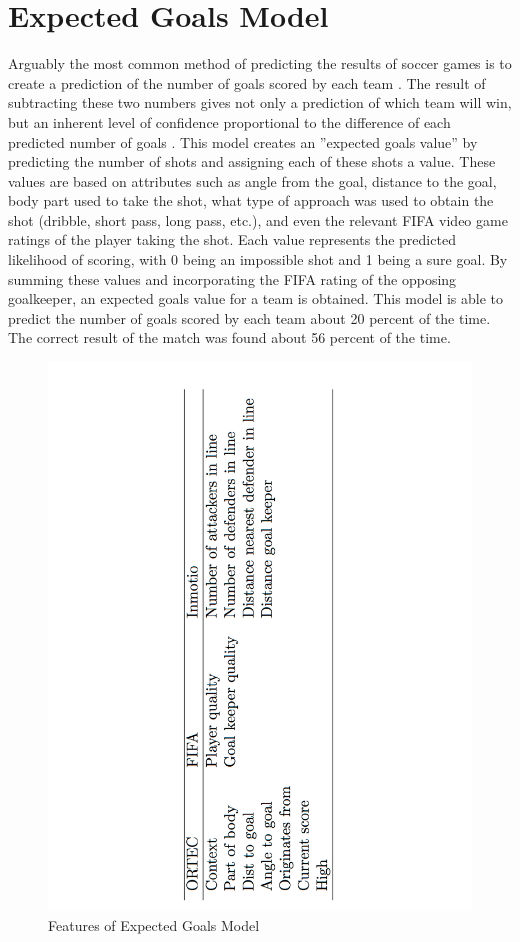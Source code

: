 \documentclass[sigconf]{acmart}
\begin{document}
\section{Expected Goals Model}
Arguably the most common method of predicting the results of soccer games is to create a prediction of the number of goals scored by each team . The result of subtracting these two numbers gives not only a prediction of which team will win, but an inherent level of confidence proportional to the difference of each predicted number of goals \cite{ExpectedGoals}. This model creates an ''expected goals value'' by predicting the number of shots and assigning each of these shots a value. These values are based on attributes such as angle from the goal, distance to the goal, body part used to take the shot, what type of approach was used to obtain the shot (dribble, short pass, long pass, etc.), and even the relevant FIFA video game ratings of the player taking the shot. Each value represents the predicted likelihood of scoring, with 0 being an impossible shot and 1 being a sure goal. By summing these values and incorporating the FIFA rating of the opposing goalkeeper, an expected goals value for a team is obtained. This model is able to predict the number of goals scored by each team about 20 percent of the time. The correct result of the match was found about 56 percent of the time\cite{ExpectedGoals}. 

\begin{figure}
\centering
\includegraphics[scale=.2]{images/features.pdf}
\caption{Features of Expected Goals Model}
\label{fig:Features of Expected Goals Model}
\end{figure}
\end{document}
